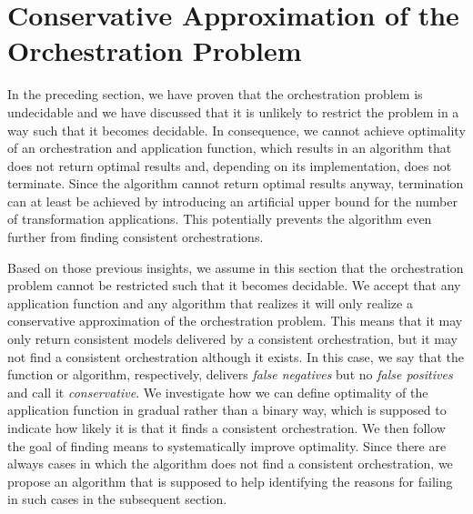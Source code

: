 \section{Conservative Approximation of the Orchestration Problem}

In the preceding section, we have proven that the orchestration problem is undecidable and we have discussed that it is unlikely to restrict the problem in a way such that it becomes decidable.
In consequence, we cannot achieve optimality of an orchestration and application function, which results in an 
algorithm that does not return optimal results and, depending on its implementation, does not terminate.
Since the algorithm cannot return optimal results anyway, termination can at least be achieved by introducing an artificial upper bound for the number of transformation applications.
This potentially prevents the algorithm even further from finding consistent orchestrations.

Based on those previous insights, we assume in this section that the orchestration problem cannot be restricted such that it becomes decidable.
We accept that any application function and any algorithm that realizes it will only realize a conservative approximation of the orchestration problem.
This means that it may only return consistent models delivered by a consistent orchestration, but it may not find a consistent orchestration although it exists.
In this case, we say that the function or algorithm, respectively, delivers \emph{false negatives} but no \emph{false positives} and call it \emph{conservative}.
We investigate how we can define optimality of the application function in gradual rather than a binary way, which is supposed to indicate how likely it is that it finds a consistent orchestration.
We then follow the goal of finding means to systematically improve optimality.
Since there are always cases in which the algorithm does not find a consistent orchestration, we propose an algorithm that is supposed to help identifying the reasons for failing in such cases in the subsequent section.



